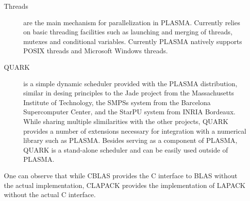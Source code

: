 \begin{description}
\item[Threads]
are the main mechanism for parallelization in PLASMA.
Currently relies on basic threading facilities such as launching and merging of threads,
mutexes and conditional variables.
Currently PLASMA natively supports POSIX threads and Microsoft Windows threads.

\item[QUARK]
is a simple dynamic scheduler provided with the PLASMA distribution, similar in desing principles
to the Jade project from the Massachusetts Institute of Technology, the SMPSs system from the
Barcelona Supercomputer Center, and the StarPU system from INRIA Bordeaux.
While sharing multiple slimilarities with the other projects, QUARK provides a number of extensions
necessary for integration with a numerical library such as PLASMA.
Besides serving as a component of PLASMA, QUARK is a \mbox{stand-alone} scheduler and can be
easily used outside of PLASMA.

\end{description}

One can observe that while
CBLAS provides the C interface to BLAS without the actual implementation,
CLAPACK provides the implementation of LAPACK without the actual C interface.






